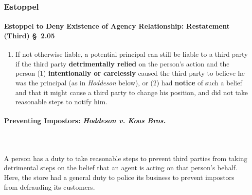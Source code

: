 \subsubsection{Estoppel}

\paragraph{Estoppel to Deny Existence of Agency Relationship: Restatement 
(Third) \S\ 2.05}

\begin{enumerate}
    \item If not otherwise liable, a potential principal can still be liable 
    to a third party if the third party \textbf{detrimentally relied} on the 
    person's action and the person (1) \textbf{intentionally or carelessly} 
    caused the third party to believe he was the principal (as in 
    \emph{Hoddeson} below), or (2) had \textbf{notice} of such a belief and 
    that it might cause a third party to change his position, and did not take 
    reasonable steps to notify him.
\end{enumerate}

\paragraph{Preventing Impostors: \emph{Hoddeson v. Koos Bros.}}
~\\\\
A person has a duty to take reasonable steps to prevent third parties from taking 
detrimental steps on the belief that an agent is acting on that person's 
behalf. Here, the store had a general duty to police its business to prevent 
impostors from defrauding its customers.

